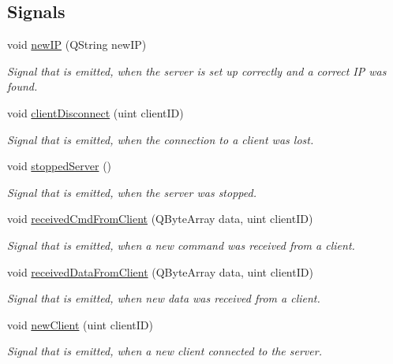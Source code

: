 \subsection*{Signals}
\begin{DoxyCompactItemize}
\item 
void \hyperlink{class_network_1_1_server_socket_a454aaa0c29dcf8558061145ca200c3aa}{new\+I\+P} (Q\+String new\+I\+P)
\begin{DoxyCompactList}\small\item\em Signal that is emitted, when the server is set up correctly and a correct I\+P was found. \end{DoxyCompactList}\item 
void \hyperlink{class_network_1_1_server_socket_a8788c49c9d78b0e36d04c4accee2f9c3}{client\+Disconnect} (uint client\+I\+D)
\begin{DoxyCompactList}\small\item\em Signal that is emitted, when the connection to a client was lost. \end{DoxyCompactList}\item 
void \hyperlink{class_network_1_1_server_socket_a65f1a073129152a95d54b8507620289b}{stopped\+Server} ()
\begin{DoxyCompactList}\small\item\em Signal that is emitted, when the server was stopped. \end{DoxyCompactList}\item 
void \hyperlink{class_network_1_1_server_socket_ae1d282d143e7036b55e5e7ae983c29b7}{received\+Cmd\+From\+Client} (Q\+Byte\+Array data, uint client\+I\+D)
\begin{DoxyCompactList}\small\item\em Signal that is emitted, when a new command was received from a client. \end{DoxyCompactList}\item 
void \hyperlink{class_network_1_1_server_socket_a17b0484dc24fc45db95126b3244586d8}{received\+Data\+From\+Client} (Q\+Byte\+Array data, uint client\+I\+D)
\begin{DoxyCompactList}\small\item\em Signal that is emitted, when new data was received from a client. \end{DoxyCompactList}\item 
void \hyperlink{class_network_1_1_server_socket_aaf9a6226b498fa9d3a828c1ce95a5c7f}{new\+Client} (uint client\+I\+D)
\begin{DoxyCompactList}\small\item\em Signal that is emitted, when a new client connected to the server. \end{DoxyCompactList}\end{DoxyCompactItemize}
